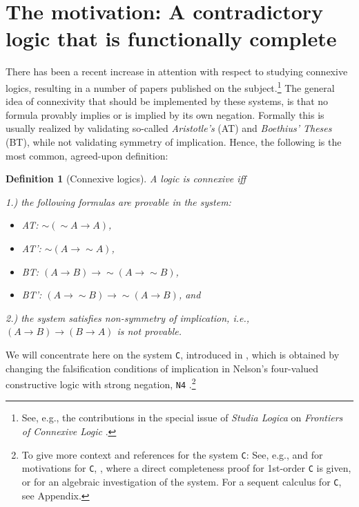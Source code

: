 \documentclass{article}%
\theoremstyle{break}
\newtheorem{definition}{Definition}
\begin{document}
\section{The motivation: A contradictory logic that is functionally complete}

There has been a recent increase in attention with respect to studying connexive logics, resulting in a number of papers published on the subject.\footnote{See, e.g., the contributions in the special issue of \emph{Studia Logica} on \emph{Frontiers of Connexive Logic} \cite{OmoriWansingSI}.}
The general idea of connexivity that should be implemented by these systems, is that no formula provably implies or is implied by its own negation. Formally this is usually realized by validating so-called \emph{Aristotle's} (AT) and \emph{Boethius' Theses} (BT), while not validating symmetry of implication.
Hence, the following is the most common, agreed-upon definition:

\begin{definition}[Connexive logics]
 A logic is connexive iff 
 
 1.) the following formulas are provable in the system:
\begin{itemize}
		\item AT: ${\sim} ({\sim} A \rightarrow A)$,
		\item AT': ${\sim} (A \rightarrow {\sim} A)$,
		\item BT: $(A \rightarrow B) \rightarrow {\sim}(A \rightarrow {\sim} B)$,
		\item BT': $(A \rightarrow {\sim} B) \rightarrow {\sim}(A \rightarrow B)$, and
\end{itemize}

2.) the system satisfies non-symmetry of implication, i.e., $(A\rightarrow B) \rightarrow (B \rightarrow A)$ is not provable.
\end{definition}
We will concentrate here on the system \texttt{C}, introduced in \cite{Wansing2005}, which is obtained by changing the falsification conditions of implication in Nelson's four-valued constructive logic with strong negation, \texttt{N4} \cite{AN1984, Nelson1949}.\footnote{To give more context and references for the system \texttt{C}: See, e.g., \cite{Wansing2024} and \cite{WansingWeber} for motivations for \texttt{C}, \cite{Olkhovikov2023}, where a direct completeness proof for 1st-order \texttt{C} is given, or \cite{FazioOdintsov2024} for an algebraic investigation of the system. For a sequent calculus for \texttt{C}, see Appendix.}
\end{document}
